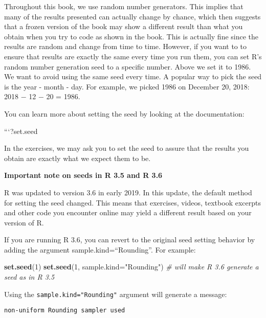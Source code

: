 \documentclass[
]{article}
\newenvironment{Shaded}{\begin{snugshade}}{\end{snugshade}}
\newcommand{\CommentTok}[1]{\textcolor[rgb]{0.56,0.35,0.01}{\textit{#1}}}
\newcommand{\DataTypeTok}[1]{\textcolor[rgb]{0.13,0.29,0.53}{#1}}
\newcommand{\DecValTok}[1]{\textcolor[rgb]{0.00,0.00,0.81}{#1}}
\newcommand{\KeywordTok}[1]{\textcolor[rgb]{0.13,0.29,0.53}{\textbf{#1}}}
\newcommand{\NormalTok}[1]{#1}
\newcommand{\StringTok}[1]{\textcolor[rgb]{0.31,0.60,0.02}{#1}}
\begin{document}
Throughout this book, we use random number generators. This implies that
many of the results presented can actually change by chance, which then
suggests that a frozen version of the book may show a different result
than what you obtain when you try to code as shown in the book. This is
actually fine since the results are random and change from time to time.
However, if you want to to ensure that results are exactly the same
every time you run them, you can set R's random number generation seed
to a specific number. Above we set it to 1986. We want to avoid using
the same seed every time. A popular way to pick the seed is the year -
month - day. For example, we picked 1986 on December 20, 2018: 2018 − 12
− 20 = 1986.

You can learn more about setting the seed by looking at the
documentation:

\begin{Shaded}
\begin{Highlighting}[]
\StringTok{```}\DataTypeTok{?set.seed}
\end{Highlighting}
\end{Shaded}

In the exercises, we may ask you to set the seed to assure that the
results you obtain are exactly what we expect them to be.

\textbf{Important note on seeds in R 3.5 and R 3.6}

R was updated to version 3.6 in early 2019. In this update, the default
method for setting the seed changed. This means that exercises, videos,
textbook excerpts and other code you encounter online may yield a
different result based on your version of R.

If you are running R 3.6, you can revert to the original seed setting
behavior by adding the argument sample.kind=``Rounding''. For example:

\begin{Shaded}
\begin{Highlighting}[]
\KeywordTok{set.seed}\NormalTok{(}\DecValTok{1}\NormalTok{)}
\KeywordTok{set.seed}\NormalTok{(}\DecValTok{1}\NormalTok{, }\DataTypeTok{sample.kind=}\StringTok{"Rounding"}\NormalTok{)    }\CommentTok{# will make R 3.6 generate a seed as in R 3.5}
\end{Highlighting}
\end{Shaded}

Using the \texttt{sample.kind="Rounding"} argument will generate a
message:

\texttt{non-uniform\ \textquotesingle{}Rounding\textquotesingle{}\ sampler\ used}
\end{document}
